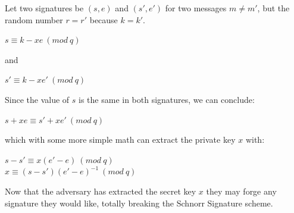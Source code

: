 \documentclass[letterpaper,11pt,notitlepage,fleqn]{article}
\begin{document}
Let two signatures be $(s,e)$ and $(s',e')$ for two messages $m \neq m'$, but the random number $r = r'$ because $k=k'$. 

\begin{center}
    $s \equiv k -xe\ (mod\ q)$
\end{center}
and 
\begin{center}
    $s' \equiv k -xe'\ (mod\ q)$
\end{center}

Since the value of $s$ is the same in both signatures, we can conclude:
\begin{center}
    $s + xe \equiv s' + xe'\ (mod\ q)$
\end{center}
which with some more simple math can extract the private key $x$ with:
\begin{center}
    $s-s' \equiv x(e'-e)\ (mod\ q)$\\
    $x \equiv (s-s')(e'-e)^{-1}\ (mod\ q)$
\end{center}
Now that the adversary has extracted the secret key $x$ they may forge any signature they would like, totally breaking the Schnorr Signature scheme.

\end{document}
